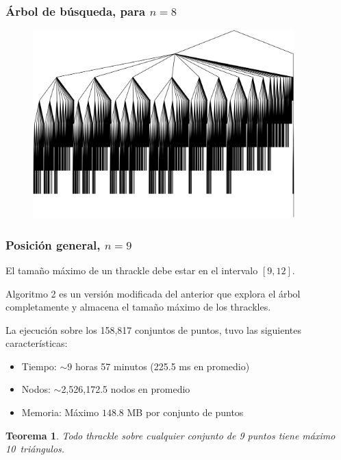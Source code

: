 \documentclass{beamer}
\newtheorem{teo}{Teorema}
\begin{document}
\begin{frame}
  \frametitle{Árbol de búsqueda, para $n=8$}
  \begin{figure}[htb]
    \includegraphics[width=0.9\textwidth]{n_8_thr_first.png}
  \end{figure}
\end{frame}

\begin{frame}
  \frametitle{Posición general, $n=9$}
  El tamaño máximo de un thrackle debe estar en el intervalo $[9,12]$.
  \vspace{0.3cm}

  Algoritmo 2 es un versión modificada del anterior que explora el árbol
  completamente y almacena el tamaño máximo de los thrackles.
  \vspace{0.3cm}

  La ejecución sobre los 158,817 conjuntos de puntos, tuvo las siguientes
  características:
  \begin{itemize}[leftmargin=1cm]
    \item Tiempo: $\sim9$ horas 57 minutos (225.5 ms en promedio)
    \item Nodos: $\sim$2,526,172.5 nodos en promedio
    \item Memoria: Máximo $148.8$ MB por conjunto de puntos
  \end{itemize}

  \vspace{0.3cm}
  \pause
  \begin{teo}
    Todo thrackle sobre cualquier conjunto de 9 puntos tiene máximo
    10~triángulos.
  \end{teo}
\end{frame}
\end{document}
